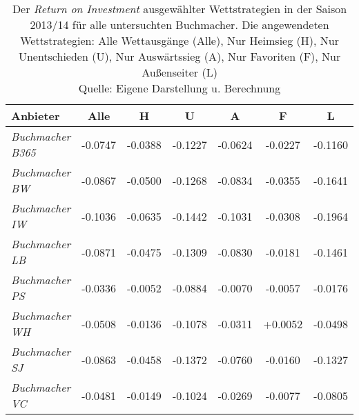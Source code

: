\begin{table}
\centering
	\begin{tabular}{lcccccc}
	\toprule
	\textbf{Anbieter} & \textbf{Alle} & \textbf{H} & \textbf{U} & \textbf{A} & \textbf{F} & \textbf{L} \\
	\midrule
	\textit{Buchmacher B365} & -0.0747 & -0.0388 & -0.1227 & -0.0624 & -0.0227 & -0.1160 \\
	\textit{Buchmacher BW} & -0.0867 & -0.0500 & -0.1268 & -0.0834 & -0.0355 & -0.1641 \\
	\textit{Buchmacher IW} & -0.1036 & -0.0635 & -0.1442 & -0.1031 & -0.0308 & -0.1964 \\
	\textit{Buchmacher LB} & -0.0871 & -0.0475 & -0.1309 & -0.0830 & -0.0181 & -0.1461 \\
	\textit{Buchmacher PS} & -0.0336 & -0.0052 & -0.0884 & -0.0070 & -0.0057 & -0.0176 \\
	\textit{Buchmacher WH} & -0.0508 & -0.0136 & -0.1078 & -0.0311 & +0.0052 & -0.0498 \\
	\textit{Buchmacher SJ} & -0.0863 & -0.0458 & -0.1372 & -0.0760 & -0.0160 & -0.1327 \\
	\textit{Buchmacher VC} & -0.0481 & -0.0149 & -0.1024 & -0.0269 & -0.0077 & -0.0805 \\
	\toprule
	\end{tabular}

\caption[RoI ausgewählter Wettstrategien in der Saison 2013/14]{Der \textit{Return on Investment} ausgewählter Wettstrategien in der Saison 2013/14 für alle untersuchten Buchmacher. Die angewendeten Wettstrategien: Alle Wettausgänge (Alle), Nur Heimsieg (H), Nur Unentschieden (U), Nur Auswärtssieg (A), Nur Favoriten (F), Nur Außenseiter (L)  \\ Quelle: Eigene Darstellung u. Berechnung}
\label{tab:strat:alleBuchmacher}
\end{table}

